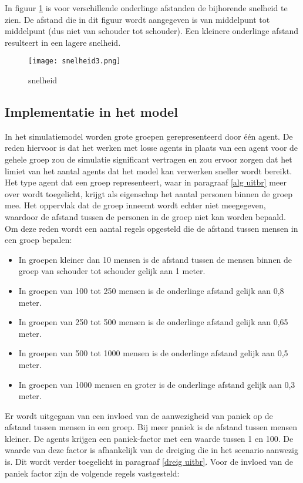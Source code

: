\documentclass[12pt, letterpaper]{article}
\begin{document}
\noindent In figuur \ref{snelheid} is voor verschillende onderlinge afstanden de bijhorende snelheid te zien. De afstand die in dit figuur wordt aangegeven is van middelpunt tot middelpunt (dus niet van schouder tot schouder). Een kleinere onderlinge afstand resulteert in een lagere snelheid.

\begin{figure}[H]
\centering
\texttt{[image: snelheid3.png]}
\caption{snelheid}
\label{snelheid}
\end{figure}

\subsection{Implementatie in het model}
In het simulatiemodel worden grote groepen gerepresenteerd door één agent. De reden hiervoor is dat het werken met losse agents in plaats van een agent voor de gehele groep zou de simulatie significant vertragen en zou ervoor zorgen dat het limiet van het aantal agents dat het model kan verwerken sneller wordt bereikt. \\
Het type agent dat een groep representeert, waar in paragraaf \ref{alg uitbr} meer over wordt toegelicht, krijgt als eigenschap het aantal personen binnen de groep mee. Het oppervlak dat de groep inneemt wordt echter niet meegegeven, waardoor de afstand tussen de personen in de groep niet kan worden bepaald.  Om deze reden wordt een aantal regels opgesteld die de afstand tussen mensen in een groep bepalen:
\begin{itemize}
    \item In groepen kleiner dan 10 mensen is de afstand tussen de mensen binnen de groep van schouder tot schouder gelijk aan 1 meter.
    \item In groepen van 100 tot 250 mensen is de onderlinge afstand gelijk aan 0,8 meter.
    \item In groepen van 250 tot 500 mensen is de onderlinge afstand gelijk aan 0,65 meter.
    \item In groepen van 500 tot 1000 mensen is de onderlinge afstand gelijk aan 0,5 meter.
    \item In groepen van 1000 mensen en groter is de onderlinge afstand gelijk aan 0,3 meter.
\end{itemize}
Er wordt uitgegaan van een invloed van de aanwezigheid van paniek op de afstand tussen mensen in een groep. Bij meer paniek is de afstand tussen mensen kleiner. De agents krijgen een paniek-factor met een waarde tussen 1 en 100. De waarde van deze factor is afhankelijk van de dreiging die in het scenario aanwezig is. Dit wordt verder toegelicht in paragraaf \ref{dreig uitbr}. Voor de invloed van de paniek factor zijn de volgende regels vastgesteld: 
\end{document}
